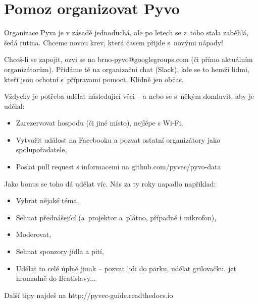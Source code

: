 \documentclass[8pt]{article}
\begin{document}
\thispagestyle{empty}

\section*{Pomoz organizovat Pyvo}

Organizace Pyva je v zásadě jednoduchá, ale po letech se z~toho stala
zaběhlá, šedá rutina.
Chceme novou krev, která časem přijde s~novými nápady!

Chceš-li se zapojit, ozvi se na brno-pyvo@googlegroups.com (či přímo aktuálním
organizátorům).
Přidáme tě na organizační chat (Slack), kde se to hemží lidmi, kteří
jsou ochotní s~přípravami pomoct. Klidně jen občas.

Vždycky je potřeba udělat následující věci – a nebo se s~někým domluvit, aby je
udělal:

\begin{itemize}[leftmargin=*]
\item
    Zarezervovat hospodu (či jiné místo), nejlépe s Wi-Fi,
\item
    Vytvořit událost na Facebooku a pozvat ostatní organizátory jako spolupořadatele,
\item
    Poslat pull request s informacemi na github.com/pyvec/pyvo-data
\end{itemize}

\bigskip

\noindent
Jako bonus se toho dá udělat víc. Nás za ty roky napadlo například:

\begin{itemize}[leftmargin=*]
\item
    Vybrat nějaké téma,
\item
    Sehnat přednášející (a~projektor a~plátno, případně i mikrofon),
\item
    Moderovat,
\item
    Sehnat sponzory jídla a pití,
\item
    Udělat to celé úplně jinak – pozvat lidi do parku, udělat grilovačku, jet hromadně do Bratislavy...
\end{itemize}

\noindent
Další tipy najdeš na http://pyvec-guide.readthedocs.io
\end{document}
